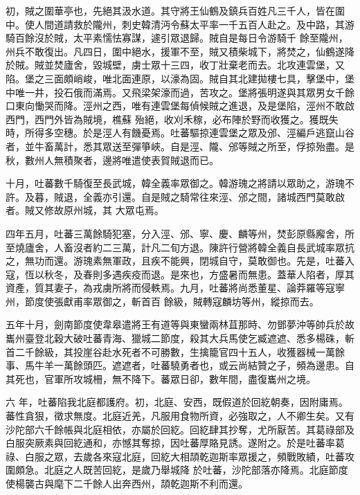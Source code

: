 \begin{pinyinscope}
 初，賊之圍華亭也，先絕其汲水道。其守將王仙鶴及鎮兵百姓凡三千人，皆在圍中。使人間道請救於隴州，刺史韓清沔令蘇太平率一千五百人赴之。及中路，其游騎百餘沒於賊，太平素懦怯寡謀，遽引眾退歸。賊自是每日令游騎千
 餘至隴州，州兵不敢復出。凡四日，圍中絕水，援軍不至，賊又積柴城下，將焚之，仙鶴遂降於賊。賊並焚廬舍，毀城壁，虜士眾十三四，收丁壯棄老而去。北攻連雲堡，又陷。堡之三面頗峭峻，唯北面連原，以濠為固。賊自其北建拋樓七具，擊堡中，堡中唯一井，投石俄而滿焉。又飛梁架濠而過，苦攻之。堡將張明遂與其眾男女千餘口東向慟哭而降。涇州之西，唯有連雲堡每偵候賊之進退，及是堡陷，涇州不敢啟西門，西門外皆為賊境，樵蘇
 殆絕，收刈禾稼，必布陣於野而收獲之。獲既失時，所得多空穗。於是涇人有饑憂焉。吐蕃驅掠連雲堡之眾及邠、涇編戶逃竄山谷者，並牛畜萬計，悉其眾送至彈箏峽。自是涇、隴、邠等賊之所至，俘掠殆盡。是秋，數州人無積聚者，邊將唯遣使表賀賊退而已。



 十月，吐蕃數千騎復至長武城，韓全義率眾御之。韓游瑰之將請以眾助之，游瑰不許。及暮，賊退，全義亦引還。自是賊之騎常往來涇、邠之間，諸城西門莫敢啟者。賊又修故原州城，其
 大眾屯焉。



 四年五月，吐蕃三萬餘騎犯塞，分入涇、邠、寧、慶、麟等州，焚彭原縣廨舍，所至燒廬舍，人畜沒者約二三萬，計凡二旬方退。陳許行營將韓全義自長武城率眾抗之，無功而還。游瑰素無軍政，且疾不能興，閉城自守，莫敢御也。先是，吐蕃入寇，恆以秋冬，及春則多遇疾疫而退。是來也，方盛暑而無患。蓋華人陷者，厚其資產，質其妻子，為戎虜所將而侵軼焉。九月，吐蕃將尚悉董星、論莽羅等寇寧州，節度使張獻甫率眾御之，斬首百
 餘級，賊轉寇麟坊等州，縱掠而去。



 五年十月，劍南節度使韋皋遣將王有道等與東蠻兩林苴那時、勿鄧夢沖等帥兵於故巂州臺登北穀大破吐蕃青海、獵城二節度，殺其大兵馬使乞臧遮遮、悉多楊硃，斬首二千餘級，其投崖谷赴水死者不可勝數，生擒籠官四十五人，收獲器械一萬餘事、馬牛羊一萬餘頭匹。遮遮者，吐蕃驍勇者也，或云尚結贊之子，頻為邊患。自其死也，官軍所攻城柵，無不降下。蕃眾日卻，數年間，盡復巂州之境。



 六
 年，吐蕃陷我北庭都護府。初，北庭、安西，既假道於回紇朝奏，因附庸焉。蕃性貪狠，徵求無度。北庭近羌，凡服用食物所資，必強取之，人不卿生矣。又有沙陀部六千餘帳與北庭相依，亦屬於回紇。回紇肆其抄奪，尤所厭苦。其葛祿部及白服突厥素與回紇通和，亦憾其奪掠，因吐蕃厚賂見誘。遂附之。於是吐蕃率葛祿、白服之眾，去歲各來寇北庭，回紇大相頡乾迦斯率眾援之，頻戰敗績，吐蕃攻圍頗急。北庭之人既苦回紇，是歲乃舉城降
 於吐蕃，沙陀部落亦降焉。北庭節度使楊襲古與麾下二千餘人出奔西州，頡乾迦斯不利而還。




\end{pinyinscope}
